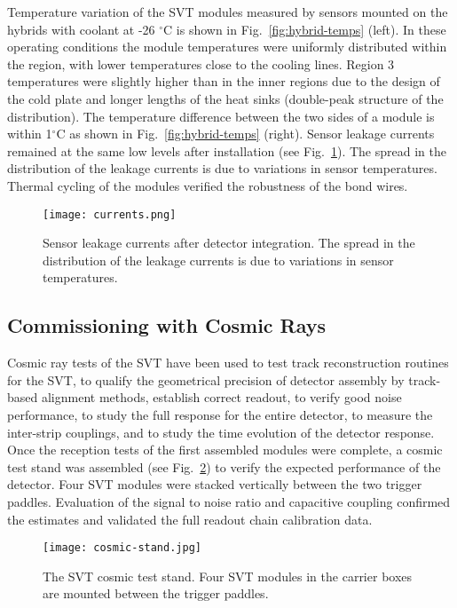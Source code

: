 Temperature variation of the SVT modules measured by sensors mounted on the hybrids with coolant at -26 $^\circ$C is shown in Fig.~\ref{fig:hybrid-temps} (left). In these operating conditions the module temperatures were uniformly distributed within the region, with lower temperatures close to the cooling lines. Region 3 temperatures were slightly higher than in the inner regions due to the design of the cold plate and longer lengths of the heat sinks (double-peak structure of the distribution). The temperature difference between the two sides of a module is within 1$^\circ$C as shown in Fig.~\ref{fig:hybrid-temps} (right). Sensor leakage currents remained at the same low levels after installation (see Fig.~\ref{fig:currents}). The spread in the distribution of the leakage currents is due to variations in sensor temperatures. Thermal cycling of the modules verified the robustness of the bond wires.

\begin{figure}[hbt] 
\centering 
\texttt{[image: currents.png]}
\caption{Sensor leakage currents after detector integration. The spread in the distribution of the leakage currents is due to variations in sensor temperatures.}
\label{fig:currents}
\end{figure}

\subsection{Commissioning with Cosmic Rays}

Cosmic ray tests of the SVT have been used to test track reconstruction routines for the SVT, to qualify the geometrical precision of detector assembly by track-based alignment methods, establish correct readout, to verify good noise performance, to study the full response for the entire detector, to measure the inter-strip couplings, and to study the time evolution of the detector response. Once the reception tests of the first assembled modules were complete, a cosmic test stand was assembled (see Fig.~\ref{fig:cosmic-stand}) to verify the expected performance of the detector. Four SVT modules were stacked vertically between the two trigger paddles. Evaluation of the signal to noise ratio and capacitive coupling confirmed the estimates and validated the full readout chain calibration data.

\begin{figure}[hbt] 
\centering 
\texttt{[image: cosmic-stand.jpg]}
\caption{The SVT cosmic test stand. Four SVT modules in the carrier boxes are mounted between the trigger paddles.}
\label{fig:cosmic-stand}
\end{figure}


